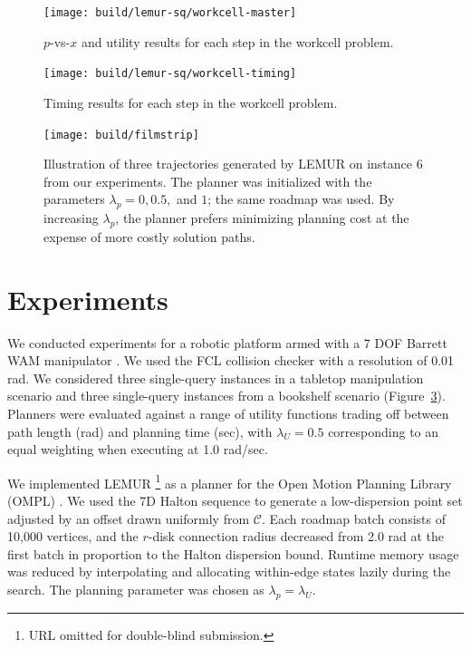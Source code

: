 \begin{figure}
   \begin{widepage}
   \centering   
   \texttt{[image: build/lemur-sq/workcell-master]}
   \end{widepage}
   \caption{$p$-vs-$x$ and utility results for each step in the
      workcell problem.}
   \label{fig:lemur:sq-workcell-master}
\end{figure}

\begin{figure}
   \begin{widepage}
   \centering   
   \texttt{[image: build/lemur-sq/workcell-timing]}
   \end{widepage}
   \caption{Timing results for each step in the workcell problem.}
   \label{fig:lemur:sq-workcell-timing}
\end{figure}

\begin{figure}
   \centering
   \texttt{[image: build/filmstrip]}
   \caption{Illustration of three trajectories generated by LEMUR
      on instance 6 from our experiments.
      The planner was initialized with the parameters
      $\lambda_p = 0, 0.5,$ and $1$;
      the same roadmap was used.
      By increasing $\lambda_p$, the planner prefers minimizing
      planning cost at the expense of more costly solution paths.}
   \label{fig:filmstrip}
\end{figure}

\section{Experiments}
\label{sec:experiments}

We conducted experiments for a robotic platform armed with a
7 DOF Barrett WAM manipulator \citep{salisbury1988wam}.
We used the FCL collision checker \citep{jiapan2012fcl} with a
resolution of 0.01 rad.
We considered three single-query instances in a tabletop
manipulation scenario
and three single-query instances from a bookshelf scenario
(Figure~\ref{fig:filmstrip}).
Planners were evaluated against a range of utility functions
trading off between path length (rad) and planning time (sec),
with $\lambda_U = 0.5$ corresponding to an equal weighting
when executing at 1.0 rad/sec.

We implemented LEMUR%
\footnote{URL omitted for double-blind submission.}
as a planner for
the Open Motion Planning Library (OMPL) \citep{sucan2012ompl}.
We used the 7D Halton sequence to generate a low-dispersion
point set adjusted by an offset drawn uniformly
from $\mathcal{C}$.
Each roadmap batch consists of 10,000 vertices,
and the $r$-disk connection radius decreased from 2.0 rad
at the first batch in proportion to the Halton dispersion bound.
Runtime memory usage was reduced by interpolating and allocating
within-edge states lazily during the search.
The planning parameter was chosen as $\lambda_p = \lambda_U$.

